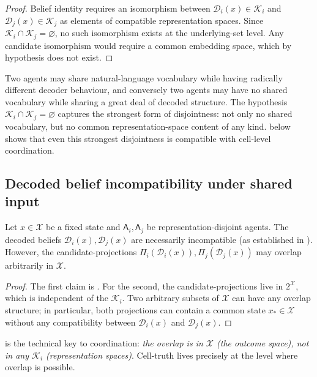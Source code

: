 \documentclass[11pt,a4paper]{article}
\newcommand{\K}{\mathcal{K}}
\newcommand{\D}{\mathcal{D}}
\newcommand{\X}{\mathcal{X}}
\newcommand{\agent}{\mathsf{A}}
\begin{document}
\begin{proof}
Belief identity requires an isomorphism between
$\D_i(x)\in\K_i$ and $\D_j(x)\in\K_j$ as elements of compatible
representation spaces. Since $\K_i\cap\K_j=\varnothing$, no such
isomorphism exists at the underlying-set level. Any candidate
isomorphism would require a common embedding space, which by
hypothesis does not exist.
\end{proof}

\begin{remark}
Two agents may share natural-language vocabulary while having radically
different decoder behaviour, and conversely two agents may have no
shared vocabulary while sharing a great deal of decoded structure. The
hypothesis $\K_i\cap\K_j=\varnothing$ captures the strongest form of
disjointness: not only no shared vocabulary, but no common
representation-space content of any kind.  below shows
that even this strongest disjointness is compatible with cell-level
coordination.
\end{remark}

\subsection{Decoded belief incompatibility under shared input}

\begin{theorem}\label{thm:identical}
Let $x\in\X$ be a fixed state and $\agent_i,\agent_j$ be
representation-disjoint agents. The decoded beliefs $\D_i(x),\D_j(x)$
are necessarily incompatible (as established in
). However, the candidate-projections
$\Pi_i(\D_i(x)),\Pi_j(\D_j(x))$ may overlap arbitrarily in $\X$.
\end{theorem}

\begin{proof}
The first claim is . For the second, the
candidate-projections live in $2^\X$, which is independent of the
$\K_i$. Two arbitrary subsets of $\X$ can have any overlap structure;
in particular, both projections can contain a common state $x_*\in\X$
without any compatibility between $\D_i(x)$ and $\D_j(x)$.
\end{proof}

\begin{remark}\label{rem:cell-key}
 is the technical key to coordination: \emph{the
overlap is in $\X$ (the outcome space), not in any $\K_i$
(representation spaces)}. Cell-truth lives precisely at the level
where overlap is possible.
\end{remark}
\end{document}
